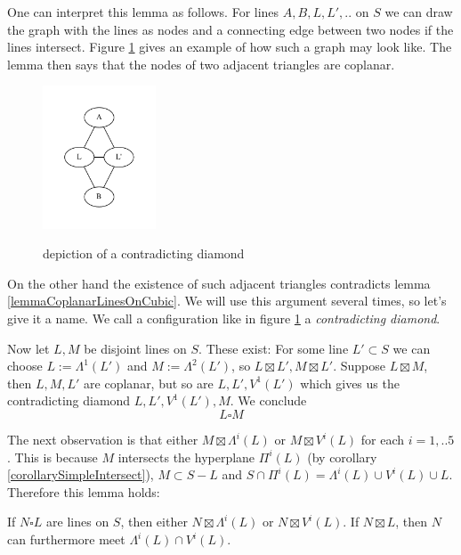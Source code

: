 One can interpret this lemma as follows.
For lines $A,B,L,L',..$ on $S$ we can draw the graph with the lines as nodes and a connecting edge between two nodes if the lines intersect.
Figure \ref{graph} gives an example of how such a graph may look like.
The lemma then says that the nodes of two adjacent triangles are coplanar.
\begin{figure}
\center
\includegraphics[width=0.3\textwidth]{img/intersectiongraph.pdf}
\label{graph}
\caption{depiction of a contradicting diamond }
\end{figure}
On the other hand the existence of such adjacent triangles contradicts lemma \ref{lemmaCoplanarLinesOnCubic}.
We will use this argument several times, so let's give it a name. We call a configuration like in figure \ref{graph} a \emph{contradicting diamond}.

Now let $L,M$ be disjoint lines on $S$.
These exist: For some line $L' \subset S$ we can choose $L := \Lambda^1(L')$ and $M := \Lambda^2(L')$, so $L \boxtimes L', M \boxtimes L'$.
Suppose $L\boxtimes M$, then $L,M,L'$ are coplanar, but so are $L,L',V^1(L')$ which gives us the contradicting diamond $L,L',V^1(L'),M$.
We conclude
\begin{equation*}
L\square M
\end{equation*}

The next observation is that either $M\boxtimes \Lambda^i(L)$ or $M\boxtimes V^i(L)$ for each $i=1,..5$.
This is because $M$ intersects the hyperplane $\Pi^i(L)$ (by corollary \ref{corollarySimpleIntersect}), $M \subset S - L$ and $S \cap \Pi^i(L) = \Lambda^i(L) \cup V^i(L) \cup L$. Therefore this lemma holds:
\begin{lemma} \label{lemmaBinaryIntersection}
If $N\square L$ are lines on $S$, then either $N \boxtimes \Lambda^i(L)$ or $N \boxtimes V^i(L)$.
If $N\boxtimes L$, then $N$ can furthermore meet $\Lambda^i(L)\cap V^i(L)$.
\end{lemma}


